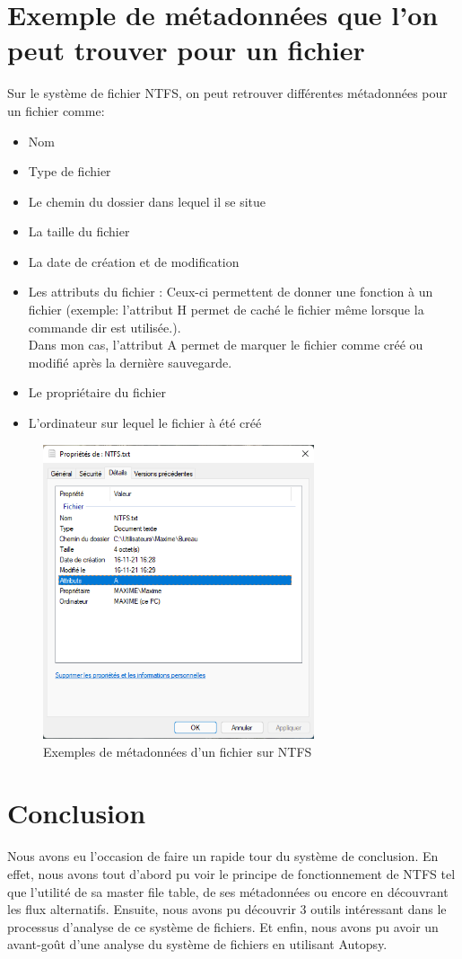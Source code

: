 \documentclass[a4paper]{article}
\begin{document}
\section{Exemple de métadonnées que l'on peut trouver pour un fichier}
Sur le système de fichier NTFS, on peut retrouver différentes métadonnées pour un fichier comme:
\begin{itemize}
    \item Nom
    \item Type de fichier
    \item Le chemin du dossier dans lequel il se situe
    \item La taille du fichier
    \item La date de création et de modification
    \item Les attributs du fichier : Ceux-ci permettent de donner une fonction à un fichier (exemple: l'attribut H permet de caché le fichier même lorsque la commande dir est utilisée.).\\
    Dans mon cas, l'attribut A permet de marquer le fichier comme créé ou modifié après la dernière sauvegarde.
    \item Le propriétaire du fichier
    \item L'ordinateur sur lequel le fichier à été créé
\end{itemize}

\begin{figure}[H]
    \centering
    \includegraphics[width=8cm]{images/metadata_ntfs.png}
    \caption{Exemples de métadonnées d'un fichier sur NTFS}
    \label{fig:metadata_ntfs}
\end{figure}








\section{Conclusion}
Nous avons eu l'occasion de faire un rapide tour du système de conclusion. En effet, nous avons tout d'abord pu voir le principe de fonctionnement de NTFS tel que l'utilité de sa master file table, de ses métadonnées ou encore en découvrant les flux alternatifs. Ensuite, nous avons pu découvrir 3 outils intéressant dans le processus d'analyse de ce système de fichiers. Et enfin, nous avons pu avoir un avant-goût d'une analyse du système de fichiers en utilisant Autopsy.
\end{document}
